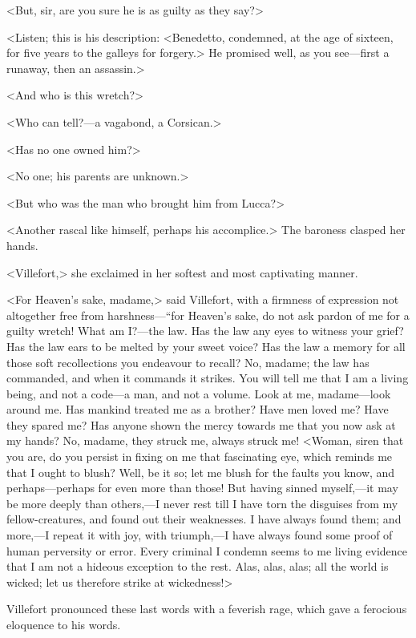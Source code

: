  <But, sir, are you sure he is as guilty as they say?> 

 <Listen; this is his description: <Benedetto, condemned, at the age of sixteen, for five years to the galleys for forgery.> He promised well, as you see—first a runaway, then an assassin.> 

 <And who is this wretch?> 

 <Who can tell?—a vagabond, a Corsican.> 

 <Has no one owned him?> 

 <No one; his parents are unknown.> 

 <But who was the man who brought him from Lucca?> 

 <Another rascal like himself, perhaps his accomplice.> The baroness clasped her hands. 

 <Villefort,> she exclaimed in her softest and most captivating manner. 

 <For Heaven's sake, madame,> said Villefort, with a firmness of expression not altogether free from harshness—“for Heaven's sake, do not ask pardon of me for a guilty wretch! What am I?—the law. Has the law any eyes to witness your grief? Has the law ears to be melted by your sweet voice? Has the law a memory for all those soft recollections you endeavour to recall? No, madame; the law has commanded, and when it commands it strikes. You will tell me that I am a living being, and not a code—a man, and not a volume. Look at me, madame—look around me. Has mankind treated me as a brother? Have men loved me? Have they spared me? Has anyone shown the mercy towards me that you now ask at my hands? No, madame, they struck me, always struck me!  <Woman, siren that you are, do you persist in fixing on me that fascinating eye, which reminds me that I ought to blush? Well, be it so; let me blush for the faults you know, and perhaps—perhaps for even more than those! But having sinned myself,—it may be more deeply than others,—I never rest till I have torn the disguises from my fellow-creatures, and found out their weaknesses. I have always found them; and more,—I repeat it with joy, with triumph,—I have always found some proof of human perversity or error. Every criminal I condemn seems to me living evidence that I am not a hideous exception to the rest. Alas, alas, alas; all the world is wicked; let us therefore strike at wickedness!> 

 Villefort pronounced these last words with a feverish rage, which gave a ferocious eloquence to his words. 

